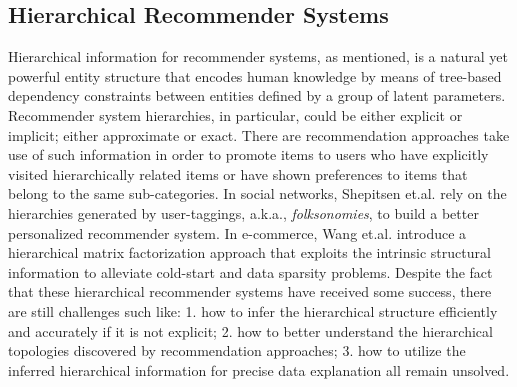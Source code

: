 \subsection{Hierarchical Recommender Systems}
Hierarchical information for recommender systems, as mentioned, is a natural yet powerful entity structure that encodes human knowledge by means of tree-based dependency constraints between entities defined by a group of latent parameters. %
Recommender system hierarchies, in particular, could be either explicit or implicit; either approximate or exact.  There are recommendation approaches take use of such information in order to promote items to users who have explicitly visited hierarchically related items or have shown preferences to items that belong to the same sub-categories.  In social networks, Shepitsen et.al. \cite{shepitsen2008personalized} rely on the hierarchies generated by user-taggings, a.k.a., \emph{folksonomies}, to build a better personalized recommender system.  In e-commerce, Wang et.al. \cite{wang2018exploring} introduce a hierarchical matrix factorization approach that exploits the intrinsic structural information to alleviate cold-start and data sparsity problems.  Despite the fact that these hierarchical recommender systems have received some success, there are still challenges such like: 1. how to infer the hierarchical structure efficiently and accurately if it is not explicit; 2. how to better understand the hierarchical topologies discovered by recommendation approaches; 3. how to utilize the inferred hierarchical information for precise data explanation all remain unsolved.

